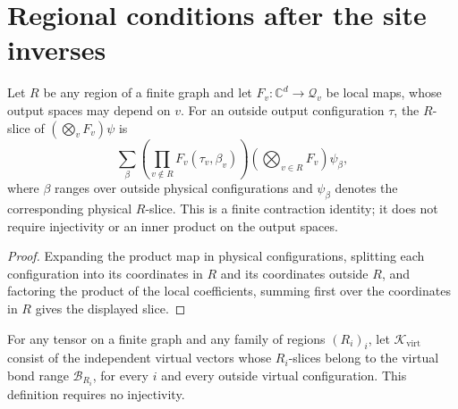 \section{Regional conditions after the site inverses}%
\label{sec:peps_vertex_inverse_region_slice}

\begin{lemma}%
    \label{lem:peps_dependent_region_slice_product}
    \leanok
    Let $R$ be any region of a finite graph and let
    $F_v:\mathbb C^d\to\mathcal Q_v$ be local maps, whose output
    spaces may depend on $v$. For an outside output configuration
    $\tau$, the $R$-slice of $(\bigotimes_vF_v)\psi$ is
    \[
        \sum_\beta
        \left(\prod_{v\notin R}F_v(\tau_v,\beta_v)\right)
        \left(\bigotimes_{v\in R}F_v\right)\psi_\beta,
    \]
    where $\beta$ ranges over outside physical configurations and
    $\psi_\beta$ denotes the corresponding physical $R$-slice.
    This is a finite contraction identity; it does not require
    injectivity or an inner product on the output spaces.
\end{lemma}

\begin{proof}\leanok
    Expanding the product map in physical configurations, splitting each
    configuration into its coordinates in $R$ and its coordinates
    outside $R$, and factoring the product of the local coefficients,
    summing first over the coordinates in $R$ gives the displayed slice.
\end{proof}

\begin{definition}%
    \label{def:peps_vertex_virtual_parent_ground_space}
    \leanok
    For any tensor on a finite graph and any family of regions
    $(R_i)_i$, let $\mathcal K_{\mathrm{virt}}$ consist of the independent
    virtual vectors whose $R_i$-slices belong to the virtual
    bond range $\mathcal B_{R_i}$, for every $i$ and every outside
    virtual configuration. This definition requires no injectivity.
\end{definition}

